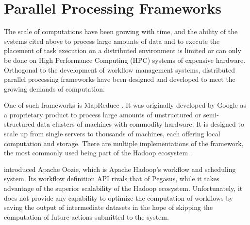 \section{Parallel Processing Frameworks}

The scale of computations have been growing with time, and the ability of the systems cited above to process large amounts of data and to execute the placement of task execution on a distributed environment is limited or can only be done on High Performance Computing (HPC) systems of expensive hardware.  Orthogonal to the development of workflow management systems, distributed parallel processing frameworks have been designed and developed to meet the growing demands of computation.  

One of such frameworks is MapReduce \citep{dean2008mapreduce}. It was originally developed by Google as a proprietary product to process large amounts of unstructured or semi-structured data clusters of machines with commodity hardware. It is designed to scale up from single servers to thousands of machines, each offering local computation and storage. There are multiple implementations of the framework, the most commonly used being part of the Hadoop ecosystem \citep{white2012hadoop}.

\cite{islam2012oozie} introduced Apache Oozie, which is Apache Hadoop's workflow and scheduling system.  Its workflow definition API rivals that of Pegasus, while it takes advantage of the superior scalability of the Hadoop ecosystem. Unfortunately, it does not provide any capability to optimize the computation of workflows by saving the output of intermediate datasets in the hope of skipping the computation of future actions submitted to the system.